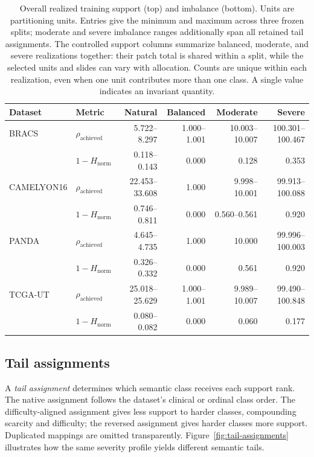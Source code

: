 \documentclass[11pt]{article}
\newcommand{\Hnorm}{1-H_{\mathrm{norm}}}
\begin{document}
\begin{table}[htbp]
  \begin{tabular}{@{}llrrrr@{}}
    \toprule
    Dataset & Metric & Natural & Balanced & Moderate & Severe \\
    \midrule
    BRACS & $\rho_{\mathrm{achieved}}$ & \num{5.722}--\num{8.297} & \num{1.000}--\num{1.001} & \num{10.003}--\num{10.007} & \num{100.301}--\num{100.467} \\
          & $\Hnorm$ & \num{0.118}--\num{0.143} & \num{0.000} & \num{0.128} & \num{0.353} \\
    \addlinespace[2pt]
    CAMELYON16 & $\rho_{\mathrm{achieved}}$ & \num{22.453}--\num{33.608} & \num{1.000} & \num{9.998}--\num{10.001} & \num{99.913}--\num{100.088} \\
          & $\Hnorm$ & \num{0.746}--\num{0.811} & \num{0.000} & \num{0.560}--\num{0.561} & \num{0.920} \\
    \addlinespace[2pt]
    PANDA & $\rho_{\mathrm{achieved}}$ & \num{4.645}--\num{4.735} & \num{1.000} & \num{10.000} & \num{99.996}--\num{100.003} \\
          & $\Hnorm$ & \num{0.326}--\num{0.332} & \num{0.000} & \num{0.561} & \num{0.920} \\
    \addlinespace[2pt]
    TCGA-UT & $\rho_{\mathrm{achieved}}$ & \num{25.018}--\num{25.629} & \num{1.000}--\num{1.001} & \num{9.989}--\num{10.007} & \num{99.490}--\num{100.848} \\
          & $\Hnorm$ & \num{0.080}--\num{0.082} & \num{0.000} & \num{0.060} & \num{0.177} \\
    \bottomrule
  \end{tabular}
  \caption{Overall realized training support (top) and imbalance (bottom). Units are partitioning units. Entries give the minimum and maximum across three frozen splits; moderate and severe imbalance ranges additionally span all retained tail assignments. The controlled support columns summarize balanced, moderate, and severe realizations together: their patch total is shared within a split, while the selected units and slides can vary with allocation. Counts are unique within each realization, even when one unit contributes more than one class. A single value indicates an invariant quantity.}
  \label{tab:realized-condition-support}
\end{table}

\subsection{Tail assignments}
A \emph{tail assignment} determines which semantic class receives each support rank. The native assignment follows the dataset's clinical or ordinal class order. The difficulty-aligned assignment gives less support to harder classes, compounding scarcity and difficulty; the reversed assignment gives harder classes more support. Duplicated mappings are omitted transparently. Figure~\ref{fig:tail-assignments} illustrates how the same severity profile yields different semantic tails.
\end{document}
